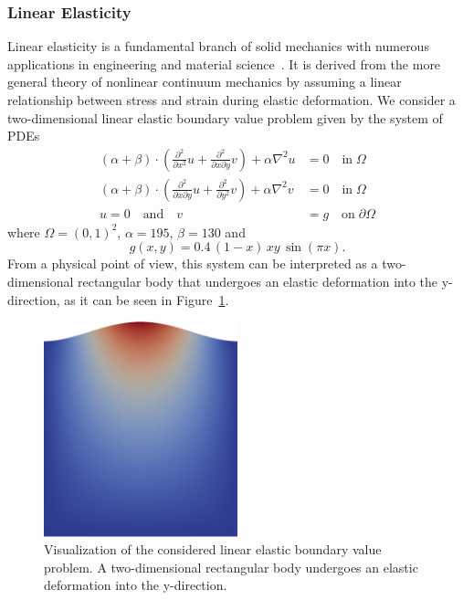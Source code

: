 \subsubsection{Linear Elasticity}
Linear elasticity is a fundamental branch of solid mechanics with numerous applications in engineering and material science~\cite{holzapfel2001nonlinear}.
It is derived from the more general theory of nonlinear continuum mechanics by assuming a linear relationship between stress and strain during elastic deformation.
We consider a two-dimensional linear elastic boundary value problem given by the system of PDEs
\begin{equation}
	\begin{split}
		(\alpha + \beta) \cdot (\frac{\partial^2}{\partial x^2} u + \frac{\partial^2}{\partial x \partial y} v) + \alpha \nabla^2 u & = 0 \quad \text{in} \; \Omega \\
		(\alpha + \beta) \cdot (\frac{\partial^2}{\partial x \partial y} u + \frac{\partial^2}{\partial y^2} v) + \alpha \nabla^2 v & = 0 \quad \text{in} \; \Omega \\
		u = 0 \quad \text{and} \quad v & = g \quad \text{on} \; \partial \Omega 
		\label{eq:linear-elasticity}
	\end{split}
\end{equation}
where $\Omega = (0,1)^2$, $\alpha = 195$, $\beta = 130$ and
\begin{equation*}
	g(x,y) = 0.4 \, (1 - x) \, x y \, \sin(\pi x).
\end{equation*}
From a physical point of view, this system can be interpreted as a two-dimensional rectangular body that undergoes an elastic deformation into the y-direction, as it can be seen in Figure~\ref{fig:visualization-linear-elasticity}.
\begin{figure}
	\centering
	\includegraphics[width=0.5\textwidth]{figures/visualization-linear-elasticity1}
	\caption{Visualization of the considered linear elastic boundary value problem. A two-dimensional rectangular body undergoes an elastic deformation into the y-direction.}
	\label{fig:visualization-linear-elasticity}
\end{figure}
